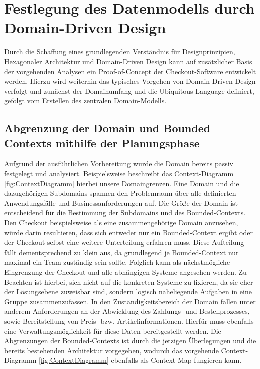 

\chapter{Festlegung des Datenmodells durch Domain-Driven Design}

Durch die Schaffung eines grundlegenden Verständnis für Designprinzipien, Hexagonaler Architektur und Domain-Driven Design kann auf zusätzlicher Basis der vorgehenden Analysen ein Proof-of-Concept der Checkout-Software entwickelt werden. Hierzu wird weiterhin das typisches Vorgehen von Domain-Driven Design verfolgt und zunächst der Domainumfang und die Ubiquitous Language definiert, gefolgt vom Erstellen des zentralen Domain-Modells.

\section{Abgrenzung der Domain und Bounded Contexts mithilfe der Planungsphase}

Aufgrund der ausführlichen Vorbereitung wurde die Domain bereits passiv festgelegt und analysiert. Beispielsweise beschreibt das Context-Diagramm \ref{fig:ContextDiagramm} hierbei unsere Domaingrenzen. Eine Domain und die dazugehörigen Subdomains spannen den Problemraum über alle definierten Anwendungsfälle und Businessanforderungen auf. Die Größe der Domain ist entscheidend für die Bestimmung der Subdomains und des Bounded-Contexts. Den Checkout beispielsweise als eine zusammengehörige Domain anzusehen, würde darin resultieren, dass sich entweder nur ein Bounded-Context ergibt oder der Checkout selbst eine weitere Unterteilung erfahren muss. Diese Aufteilung fällt dementsprechend zu klein aus, da grundlegend je Bounded-Context nur maximal ein Team zuständig sein sollte. Folglich kann als nächstmögliche Eingrenzung der Checkout und alle abhängigen Systeme angesehen werden. Zu Beachten ist hierbei, sich nicht auf die konkreten Systeme zu fixieren, da sie eher der Lösungsebene zuweisbar sind, sondern logisch naheliegende Aufgaben in eine Gruppe zusammenzufassen. In den Zuständigkeitsbereich der Domain fallen unter anderem Anforderungen an der Abwicklung des Zahlungs- und Bestellprozesses, sowie Bereitstellung von Preis- bzw. Artikelinformationen. Hierfür muss ebenfalls eine Verwaltungsmöglichkeit für diese Daten bereitgestellt werden. Die Abgrenzungen der Bounded-Contexts ist durch die jetzigen Überlegungen und die bereits bestehenden Architektur vorgegeben, wodurch das vorgehende Context-Diagramm \ref{fig:ContextDiagramm} ebenfalls als Context-Map fungieren kann.

